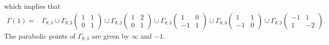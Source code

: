 \documentclass[12pt]{article}
\theoremstyle{definition}
\numberwithin{equation}{section}
\numberwithin{theorem}{section}
\begin{document}
which implies that 
\begin{align*}
\Gamma(1)=&
\Gamma_{\theta,3} 
\cup
\Gamma_{\theta,3} 
\begin{pmatrix}
1 & 1 \\
0 & 1
\end{pmatrix} 
\cup
\Gamma_{\theta,3} 
\begin{pmatrix}
1 & 2 \\
0 & 1
\end{pmatrix} 
\cup
\Gamma_{\theta,3} 
\begin{pmatrix}
1 & 0 \\
-1 & 1
\end{pmatrix} 
\cup
\Gamma_{\theta,3} 
\begin{pmatrix}
1 & 1 \\
-1& 0
\end{pmatrix} 
\cup
\Gamma_{\theta,3} 
\begin{pmatrix}
-1 & 1 \\
1 & -2
\end{pmatrix}. 
\end{align*}
The parabolic points of $\Gamma_{\theta,3}$ are given by $\infty$ and $-1.$ 
\end{document}
